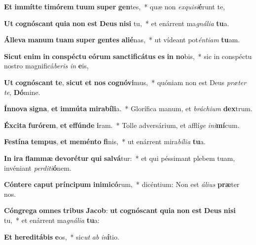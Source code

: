 \item \textbf{Et} \textbf{im}\textbf{mít}\textbf{te} \textbf{ti}\textbf{mó}\textbf{rem} \textbf{tu}\textbf{um} \textbf{su}\textbf{per} \textbf{gen}tes,~* quæ non \textit{ex}\textit{qui}\textit{si}\textbf{é}runt te,
\item \textbf{Ut} \textbf{co}\textbf{gnós}\textbf{cant} \textbf{qui}\textbf{a} \textbf{non} \textbf{est} \textbf{De}\textbf{us} \textbf{ni}\textbf{si} tu,~* et enárrent ma\textit{gná}\textit{li}\textit{a} \textbf{tu}a.
\item \textbf{Ál}\textbf{le}\textbf{va} \textbf{ma}\textbf{num} \textbf{tu}\textbf{am} \textbf{su}\textbf{per} \textbf{gen}\textbf{tes} \textbf{a}\textbf{li}\textbf{é}nas,~* ut vídeant pot\textit{én}\textit{ti}\textit{am} \textbf{tu}am.
\item \textbf{Sic}\textbf{ut} \textbf{e}\textbf{nim} \textbf{in} \textbf{con}\textbf{spéc}\textbf{tu} \textbf{e}\textbf{ó}\textbf{rum} \textbf{sanc}\textbf{ti}\textbf{fi}\textbf{cá}\textbf{tus} \textbf{es} \textbf{in} \textbf{no}bis,~* sic in conspéctu nostro magnificá\textit{be}\textit{ris} \textit{in} \textbf{e}is,
\item \textbf{Ut} \textbf{co}\textbf{gnós}\textbf{cant} \textbf{te}, \textbf{sic}\textbf{ut} \textbf{et} \textbf{nos} \textbf{co}\textbf{gnó}\textbf{vi}mus,~* quóniam non est Deus \textit{præ}\textit{ter} \textit{te}, \textbf{Dó}mine.
\item \textbf{Ín}\textbf{no}\textbf{va} \textbf{si}\textbf{gna}, \textbf{et} \textbf{im}\textbf{mú}\textbf{ta} \textbf{mi}\textbf{ra}\textbf{bí}\textbf{li}a.~* Glorífica manum, et \textit{brá}\textit{chi}\textit{um} \textbf{dex}trum.
\item \textbf{Éx}\textbf{ci}\textbf{ta} \textbf{fu}\textbf{ró}\textbf{rem}, \textbf{et} \textbf{ef}\textbf{fún}\textbf{de} \textbf{i}ram.~* Tolle adversárium, et afflí\textit{ge} \textit{in}\textit{i}\textbf{mí}cum.
\item \textbf{Fes}\textbf{tí}\textbf{na} \textbf{tem}\textbf{pus}, \textbf{et} \textbf{me}\textbf{mén}\textbf{to} \textbf{fi}nis,~* ut enárrent mira\textit{bí}\textit{li}\textit{a} \textbf{tu}a.
\item \textbf{In} \textbf{i}\textbf{ra} \textbf{flam}\textbf{mæ} \textbf{de}\textbf{vo}\textbf{ré}\textbf{tur} \textbf{qui} \textbf{sal}\textbf{vá}tur:~* et qui péssimant plebem tuam, invéniant \textit{per}\textit{di}\textit{ti}\textbf{ó}nem.
\item \textbf{Cón}\textbf{te}\textbf{re} \textbf{ca}\textbf{put} \textbf{prín}\textbf{ci}\textbf{pum} \textbf{in}\textbf{i}\textbf{mi}\textbf{có}rum,~* dicéntium: Non est \textit{á}\textit{li}\textit{us} \textbf{præ}ter nos.
\item \textbf{Cón}\textbf{gre}\textbf{ga} \textbf{om}\textbf{nes} \textbf{tri}\textbf{bus} \textbf{Ja}\textbf{cob}: \textbf{ut} \textbf{co}\textbf{gnós}\textbf{cant} \textbf{qui}\textbf{a} \textbf{non} \textbf{est} \textbf{De}\textbf{us} \textbf{ni}\textbf{si} tu,~* et enárrent ma\textit{gná}\textit{li}\textit{a} \textbf{tu}a:
\item \textbf{Et} \textbf{he}\textbf{re}\textbf{di}\textbf{tá}\textbf{bis} \textbf{e}os,~* sic\textit{ut} \textit{ab} \textit{in}\textbf{í}tio.
